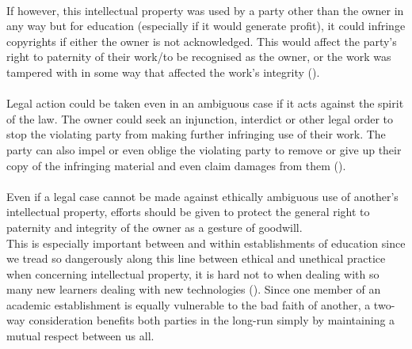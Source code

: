 \\If however, this intellectual property was used by a party other than the owner in any way but for education (especially if it would generate profit), it could infringe copyrights if either the owner is not acknowledged. This would affect the party’s right to paternity of their work/to be recognised as the owner, or the work was tampered with in some way that affected the work’s integrity (\cite{LSEPIinComputerTech}).
\\\\Legal action could be taken even in an ambiguous case if it acts against the spirit of the law. The owner could seek an injunction, interdict or other legal order to stop the violating party from making further infringing use of their work. The party can also impel or even oblige the violating party to remove or give up their copy of the infringing material and even claim damages from them (\cite{JiscLegal-IntellectualProp.}).
\\\\Even if a legal case cannot be made against ethically ambiguous use of another's intellectual property, efforts should be given to protect the general right to paternity and integrity of the owner as a gesture of goodwill.
\\This is especially important between and within establishments of education since we tread so dangerously along this line between ethical and unethical practice when concerning intellectual property, it is hard not to when dealing with so many new learners dealing with new technologies (\cite{JiscLegal-IntellectualProp.}). Since one member of an academic establishment is equally vulnerable to the bad faith of another, a two-way consideration benefits both parties in the long-run simply by maintaining a mutual respect between us all.
